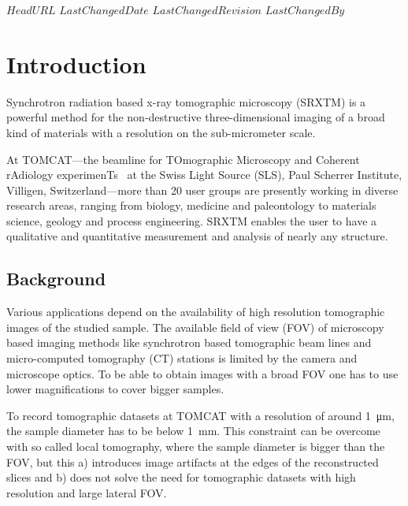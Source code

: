 \svnidlong
{$HeadURL$}
{$LastChangedDate$}
{$LastChangedRevision$}
{$LastChangedBy$}

\ifhtml
\else
\begin{center}
\end{center}
\fi

\section{Introduction}
Synchrotron radiation based x-ray tomographic microscopy (SRXTM) is a powerful method for the non-destructive three-dimensional imaging of a broad kind of materials with a resolution on the sub-micrometer scale.

At TOMCAT---the beamline for TOmographic Microscopy and Coherent rAdiology experimenTs~\cite{Stampanoni2007} at the Swiss Light Source (SLS), Paul Scherrer Institute, Villigen, Switzerland---more than 20 user groups are presently working in diverse research areas, ranging from biology, medicine and paleontology to materials science, geology and process engineering. SRXTM enables the user to have a qualitative and quantitative measurement and analysis of nearly any structure.

\subsection{Background}
Various applications depend on the availability of high resolution tomographic images of the studied sample. The available field of view (FOV) of microscopy based imaging methods like synchrotron based tomographic beam lines and micro-computed tomography (\micro CT) stations is limited by the camera and microscope optics. To be able to obtain images with a broad FOV one has to use lower magnifications to cover bigger samples.

To record tomographic datasets at TOMCAT with a resolution of around \SI{1}{\micro\meter}, the sample diameter has to be below \SI{1}{\milli\meter}. This constraint can be overcome with so called local tomography, where the sample diameter is bigger than the FOV, but this a) introduces image artifacts at the edges of the reconstructed slices and b) does not solve the need for tomographic datasets with high resolution and large lateral FOV.

